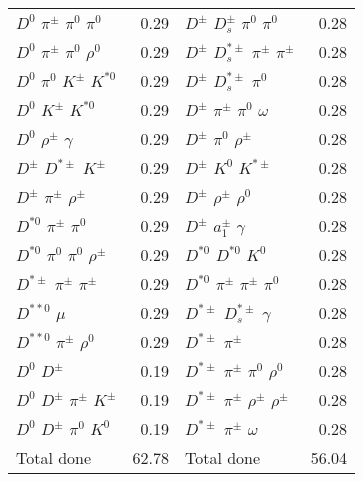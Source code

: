 \documentclass[6pt]{article}
\begin{document}
\begin{tabular}{lr|lr}
$D^0$ $\pi^{\pm}$ $\pi^0$ $\pi^0$ & 0.29 & $D^{\pm}$ $D_s^{\pm}$ $\pi^0$ $\pi^0$ & 0.28 \\
$D^0$ $\pi^{\pm}$ $\pi^0$ $\rho^0$ & 0.29 & $D^{\pm}$ $D_s^{*\pm}$ $\pi^{\pm}$ $\pi^{\pm}$ & 0.28 \\
$D^0$ $\pi^0$ $K^{\pm}$ $K^{*0}$ & 0.29 & $D^{\pm}$ $D_s^{*\pm}$ $\pi^0$ & 0.28 \\
$D^0$ $K^{\pm}$ $K^{*0}$ & 0.29 & $D^{\pm}$ $\pi^{\pm}$ $\pi^0$ $\omega$ & 0.28 \\
$D^0$ $\rho^{\pm}$ $\gamma$ & 0.29 & $D^{\pm}$ $\pi^0$ $\rho^{\pm}$ & 0.28 \\
$D^{\pm}$ $D^{*\pm}$ $K^{\pm}$ & 0.29 & $D^{\pm}$ $K^0$ $K^{*\pm}$ & 0.28 \\
$D^{\pm}$ $\pi^{\pm}$ $\rho^{\pm}$ & 0.29 & $D^{\pm}$ $\rho^{\pm}$ $\rho^0$ & 0.28 \\
$D^{*0}$ $\pi^{\pm}$ $\pi^0$ & 0.29 & $D^{\pm}$ $a_1^{\pm}$ $\gamma$ & 0.28 \\
$D^{*0}$ $\pi^0$ $\pi^0$ $\rho^{\pm}$ & 0.29 & $D^{*0}$ $D^{*0}$ $K^0$ & 0.28 \\
$D^{*\pm}$ $\pi^{\pm}$ $\pi^{\pm}$ & 0.29 & $D^{*0}$ $\pi^{\pm}$ $\pi^{\pm}$ $\pi^0$ & 0.28 \\
$D^{**0}$ $\mu$ & 0.29 & $D^{*\pm}$ $D_s^{*\pm}$ $\gamma$ & 0.28 \\
$D^{**0}$ $\pi^{\pm}$ $\rho^0$ & 0.29 & $D^{*\pm}$ $\pi^{\pm}$ & 0.28 \\
$D^0$ $D^{\pm}$ & 0.19 & $D^{*\pm}$ $\pi^{\pm}$ $\pi^0$ $\rho^0$ & 0.28 \\
$D^0$ $D^{\pm}$ $\pi^{\pm}$ $K^{\pm}$ & 0.19 & $D^{*\pm}$ $\pi^{\pm}$ $\rho^{\pm}$ $\rho^{\pm}$ & 0.28 \\
$D^0$ $D^{\pm}$ $\pi^0$ $K^0$ & 0.19 & $D^{*\pm}$ $\pi^{\pm}$ $\omega$ & 0.28 \\
\hline Total done & 62.78 & Total done & 56.04\\
\end{tabular}
\end{document}
